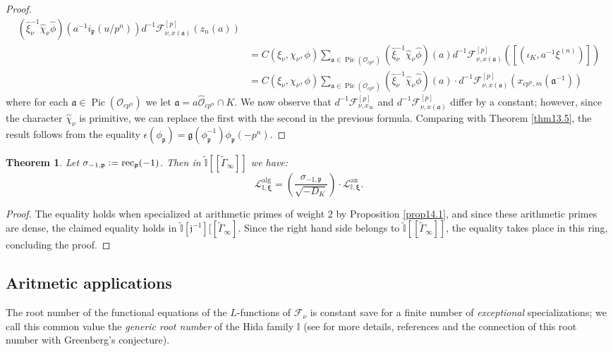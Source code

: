 \documentclass[a4paper,11pt]{amsart}
\numberwithin{equation}{section}
\theoremstyle{plain}
\newtheorem{theorem}{Theorem}[section]
\theoremstyle{definition}
\theoremstyle{remark}
\newcommand{\I}{\mathbb{I}}
\newcommand{\defeq}{\vcentcolon=}
\newcommand{\p}{\mathfrak{p}}
\DeclareMathOperator{\Pic}{Pic}
\begin{document}
\begin{proof}
\[\begin{split}
(\hat{\xi}_\nu^{-1}\hat{\chi}_\nu\hat{\phi})(a^{-1}i_{\mathfrak{p}}(u/p^{n}))d^{-1}\mathcal{F}_{\nu ,x(\mathfrak{a})}^{[p]}(z_n(a))\\
&=C(\xi_\nu,\chi_\nu,\phi)\sum_{\mathfrak{a}\in \Pic({\mathcal{O}_{cp^n}})}
(\hat{\xi}_\nu^{-1}\hat{\chi}_\nu\hat{\phi})(a)d^{-1}\mathcal{F}_{\nu ,x(\mathfrak{a})}^{[p]}
\left([(\iota_K,a^{-1}\xi^{(n)})]\right)\\
&=C(\xi_\nu,\chi_\nu,\phi)
\sum_{\mathfrak{a}\in \Pic({\mathcal{O}_{cp^n}})}
(\hat{\xi}_\nu^{-1}\hat{\chi}_\nu\hat{\phi})(a)\cdot
d^{-1}\mathcal{F}_{\nu, x(\mathfrak{a})}^{[p]}\left(x_{cp^n,m}(\mathfrak{a}^{-1})\right)\end{split}
\]
where for each $\mathfrak{a}\in\Pic(\mathcal{O}_{cp^n})$ we let 
$\mathfrak{a}=a\widehat{\mathcal{O}}_{cp^n}\cap K$. 
We now observe that 
$d^{-1}{\mathcal{F}}_{\nu ,x_\infty}^{{[p]}} $ and 
$d^{-1}{\mathcal{F}}_{\nu,x(\mathfrak{a})}^{{[p]}} $ 
differ by a constant; however, since the character $\hat\chi_\nu$ is primitive,
we can replace the first with the second in the previous formula. 
Comparing with Theorem \ref{thm13.5}, the result follows from the equality 
$\epsilon(\phi_\p)=\mathfrak{g}(\phi_\p^{-1})\phi_\p(-p^{n})$. 
\end{proof}

\begin{theorem}\label{thmL=L}
Let $\sigma_{-1,\p}\defeq \mathrm{rec}_\p(-1)$. Then in $\widetilde{\I}[[\widetilde{\Gamma}_\infty]]$ we have: 
\[\mathscr{L}_{\I,\boldsymbol{\xi}}^{\mathrm{alg}}=\left(
\frac{\sigma_{-1,\p}}{\sqrt{-D_K}}\right)\cdot\mathscr{L}_{\I,\boldsymbol{\xi}}^{\mathrm{an}}.\] \end{theorem}

\begin{proof}
The equality holds when specialized at arithmetic primes of weight $2$ by Proposition \ref{prop14.1}, and since these arithmetic primes are dense, the claimed equality holds in  
$\widetilde{\I}[\mathfrak{j}^{-1}][[\widetilde{\Gamma}_\infty]$.  
Since the right hand side belongs to $\widetilde{\I}[[\widetilde{\Gamma}_\infty]]$, the equality takes place in this ring, concluding the proof. 
\end{proof}

\subsection{Aritmetic applications}\label{secArithApp}
The root number of the functional equations of the $L$-functions of $\mathcal{F}_\nu$ is constant save for a finite number of \emph{exceptional} specializations; we call this common value the \emph{generic root number} of the Hida family $\I$ (see \cite[\S9.2]{LV-MM} for more details, references and the connection of this root number with Greenberg's conjecture).  
\end{document}
